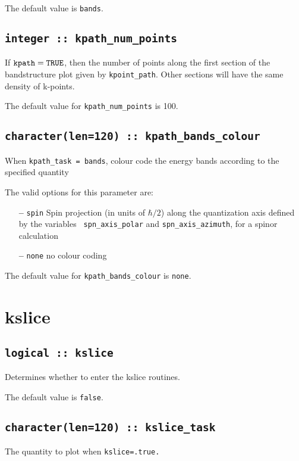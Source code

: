 The default value is {\tt bands}.


\subsection[kpath\_num\_points]{\tt integer :: kpath\_num\_points}

If $\verb#kpath#=\verb#TRUE#$, then the number of points along
the first section of the bandstructure plot given by
\verb#kpoint_path#. Other sections will have the same density of
k-points. 

The default value for \verb#kpath_num_points# is 100.


\subsection[kpath\_colour]{\tt character(len=120) ::
  kpath\_bands\_colour}
When {\tt kpath\_task = bands}, colour code the energy bands according
to the specified quantity

The valid options for this parameter are:
\begin{itemize}
\item[{\bf --}] \verb#spin# Spin projection (in units of $\hbar/2$)
  along the quantization axis defined by the variables {\tt
    spn\_axis\_polar} and {\tt spn\_axis\_azimuth}, for a spinor
  calculation
\item[{\bf --}]  \verb#none# no colour coding
\end{itemize}

The default value for {\tt kpath\_bands\_colour} is {\tt none}.


\clearpage
\section{kslice}

\subsection[berry]{\tt logical :: kslice}
Determines whether to enter the kslice routines.

The default value is \verb#false#.

\subsection[kslice\_task]{\tt character(len=120) ::  kslice\_task}
The quantity to plot when {\tt kslice=.true.} 

